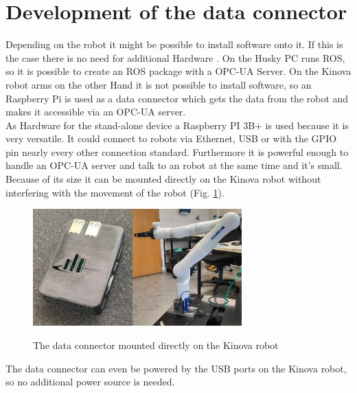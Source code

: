 \documentclass[conference]{IEEEtran}
\begin{document}
\section{Development of the data connector}
Depending on the robot it might be possible to install software onto it.
If this is the case there is no need for additional Hardware .
On the Husky PC runs ROS, so it is possible to create an ROS package with a OPC-UA Server.
On the Kinova robot arms on the other Hand it is not possible to install software, so an Raspberry Pi is used as a data connector which gets the data from the robot and makes it accessible via an OPC-UA server.\\
As Hardware for the stand-alone device a Raspberry PI 3B+ is used because it is very versatile. It could connect to robots via Ethernet, USB or with the GPIO pin nearly every other connection standard.
Furthermore it is powerful enough to handle an OPC-UA server and talk to an robot at the same time and it's small.
Because of its size it can be mounted directly on the Kinova robot without interfering with the movement of the robot (Fig. \ref{fig:dataConectorPic}).
\begin{figure}[htbp]
    \centerline{\includegraphics[height=4.5cm]{Pictures/PiGehaeuseVorne.jpeg}\hspace{0.1cm}\includegraphics[height=4.5cm]{Pictures/PiAmKinova.jpeg}}
    \caption{The data connector mounted directly on the Kinova robot}
    \label{fig:dataConectorPic}
\end{figure}
The data connector can even be powered by the USB ports on the Kinova robot, so no additional power source is needed.\\
\end{document}
